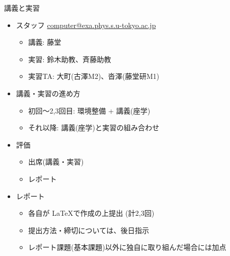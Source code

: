 \begin{frame}[t,fragile]{講義と実習}
  \begin{itemize}
  \item スタッフ \href{mailto:computer@exa.phys.s.u-tokyo.ac.jp}{computer@exa.phys.s.u-tokyo.ac.jp}
    \begin{itemize}
    \item 講義: 藤堂
    \item 実習: 鈴木助教、斉藤助教
    \item 実習TA: 大町(古澤M2)、沓澤(藤堂研M1)
    \end{itemize}
  \item 講義・実習の進め方
    \begin{itemize}
    \item 初回〜2,3回目: 環境整備 + 講義(座学)
    \item それ以降: 講義(座学)と実習の組み合わせ
    \end{itemize}
  \item 評価
    \begin{itemize}
    \item 出席(講義・実習)
    \item レポート
    \end{itemize}    
  \item レポート
    \begin{itemize}
    \item 各自が \LaTeX で作成の上提出 (計2,3回)
    \item 提出方法・締切については、後日指示
    \item レポート課題(基本課題)以外に独自に取り組んだ場合には加点    \end{itemize}
  \end{itemize}    
\end{frame}


